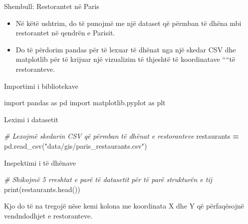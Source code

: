 \documentclass[
  ignorenonframetext,
]{beamer}
\newenvironment{Shaded}{\begin{snugshade}}{\end{snugshade}}
\newcommand{\BuiltInTok}[1]{#1}
\newcommand{\CommentTok}[1]{\textcolor[rgb]{0.56,0.35,0.01}{\textit{#1}}}
\newcommand{\ImportTok}[1]{#1}
\newcommand{\NormalTok}[1]{#1}
\newcommand{\OperatorTok}[1]{\textcolor[rgb]{0.81,0.36,0.00}{\textbf{#1}}}
\newcommand{\StringTok}[1]{\textcolor[rgb]{0.31,0.60,0.02}{#1}}
\begin{document}
\begin{frame}{Shembull: Restorantet në Paris}
\protect\hypertarget{shembull-restorantet-nuxeb-paris}{}
\begin{itemize}
\item
  Në këtë ushtrim, do të punojmë me një dataset që përmban të dhëna mbi
  restorantet në qendrën e Parisit.
\item
  Do të përdorim pandas për të lexuar të dhënat nga një skedar CSV dhe
  matplotlib për të krijuar një vizualizim të thjeshtë të koordinatave
  ````të restoranteve.
\end{itemize}
\end{frame}

\begin{frame}[fragile]{Importimi i bibliotekave}
\protect\hypertarget{importimi-i-bibliotekave}{}

\begin{Shaded}
\begin{Highlighting}[]
\ImportTok{import}\NormalTok{ pandas }\ImportTok{as}\NormalTok{ pd}
\ImportTok{import}\NormalTok{ matplotlib.pyplot }\ImportTok{as}\NormalTok{ plt}
\end{Highlighting}
\end{Shaded}
\end{frame}

\begin{frame}[fragile]{Leximi i datasetit}
\protect\hypertarget{leximi-i-datasetit}{}

\begin{Shaded}
\begin{Highlighting}[]
\CommentTok{\# Lexojmë skedarin CSV që përmban të dhënat e restoranteve}
\NormalTok{restaurants }\OperatorTok{=}\NormalTok{ pd.read\_csv(}\StringTok{"data/gis/paris\_restaurants.csv"}\NormalTok{)}
\end{Highlighting}
\end{Shaded}
\end{frame}

\begin{frame}[fragile]{Inspektimi i të dhënave}
\protect\hypertarget{inspektimi-i-tuxeb-dhuxebnave}{}

\begin{Shaded}
\begin{Highlighting}[]
\CommentTok{\# Shikojmë 5 rreshtat e parë të datasetit për të parë strukturën e tij}
\BuiltInTok{print}\NormalTok{(restaurants.head())}
\end{Highlighting}
\end{Shaded}

Kjo do të na tregojë nëse kemi kolona me koordinata X dhe Y që
përfaqësojnë vendndodhjet e restoranteve.
\end{frame}
\end{document}
